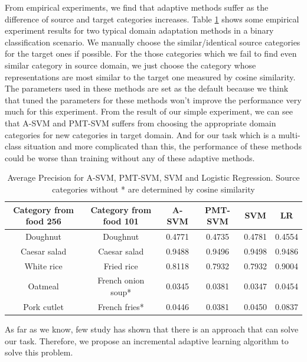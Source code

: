 From empirical experiments, we find that adaptive methods suffer as the difference of source and target categories increases. Table \ref{tab:su_domian} shows some empirical experiment results for two typical domain adaptation methods in a binary classification scenario. We manually choose the similar/identical source categories for the target ones if possible. For the those categories which we fail to find even similar category in source domain, we just choose the category whose representations are most similar to the target one measured by cosine similarity. The parameters used in these methods are set as the default because we think that tuned the parameters for these methods won't improve the performance very much for this experiment.  From the result of our simple experiment, we can see that A-SVM and PMT-SVM suffers from choosing the appropriate domain categories for new categories in target domain. And for our task which is a multi-class situation and more complicated than this, the performance of these methods could be worse than training without any of these adaptive methods.
\begin{table}[htbp]
  \centering
  \caption{Average Precision for A-SVM, PMT-SVM, SVM and Logistic Regression. Source categories without * are determined by cosine similarity}
    \begin{tabular}{cccccc}
    \toprule
    Category from food 256 & Category from food 101 & A-SVM  & PMT-SVM & SVM &LR\\
    \midrule
    Doughnut & Doughnut & 0.4771 & 0.4735 &0.4781&0.4554\\
    Caesar salad &  Caesar salad & 0.9488 & 0.9496 &0.9498&0.9486\\
    White rice  & Fried rice & 0.8118 & 0.7932 &0.7932&0.9004\\
    Oatmeal & French onion soup* & 0.0345 & 0.0381 & 0.0347 &0.0454\\
    Pork cutlet & French fries* & 0.0446 & 0.0381 &0.0450& 0.0837\\
    \bottomrule
    \end{tabular}%
  \label{tab:su_domian}%
\end{table}%

As far as we know, few study has shown that there is an approach that can solve our task. Therefore, we propose an incremental adaptive learning algorithm to solve this problem.
